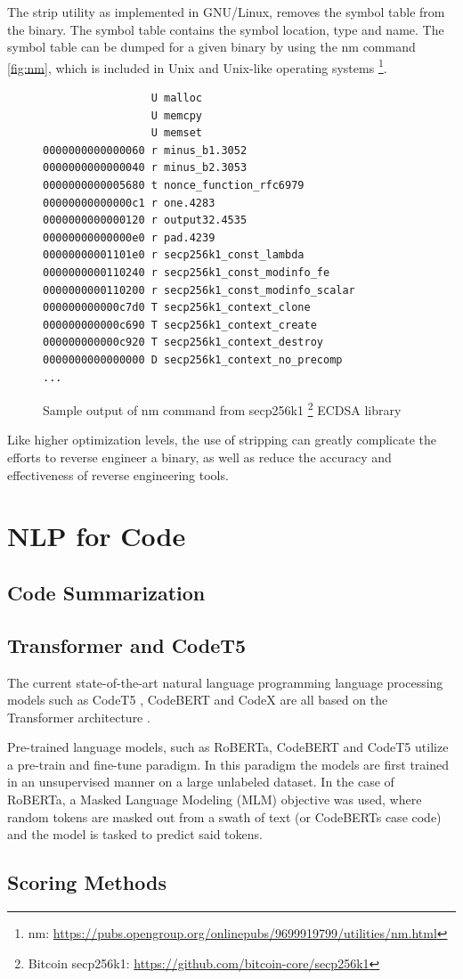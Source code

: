 The strip utility as implemented in GNU/Linux, removes the symbol table from the binary. The symbol table contains the symbol location, type and name. The symbol table can be dumped for a given binary by using the nm command \ref{fig:nm}, which is included in Unix and Unix-like operating systems \footnote{nm: \url{https://pubs.opengroup.org/onlinepubs/9699919799/utilities/nm.html}}. 

\label{fig:nm}
\begin{figure}[!h]
  \centering
\begin{lstlisting}
                 U malloc
                 U memcpy
                 U memset
0000000000000060 r minus_b1.3052
0000000000000040 r minus_b2.3053
0000000000005680 t nonce_function_rfc6979
00000000000000c1 r one.4283
0000000000000120 r output32.4535
00000000000000e0 r pad.4239
00000000001101e0 r secp256k1_const_lambda
0000000000110240 r secp256k1_const_modinfo_fe
0000000000110200 r secp256k1_const_modinfo_scalar
000000000000c7d0 T secp256k1_context_clone
000000000000c690 T secp256k1_context_create
000000000000c920 T secp256k1_context_destroy
0000000000000000 D secp256k1_context_no_precomp
...
\end{lstlisting}
  \caption{Sample output of nm command from secp256k1 \protect\footnote{Bitcoin secp256k1: \protect\url{https://github.com/bitcoin-core/secp256k1}} ECDSA library}
\end{figure}

Like higher optimization levels, the use of stripping can greatly complicate the efforts to reverse engineer a binary, as well as reduce the accuracy and effectiveness of reverse engineering tools. 
\section{NLP for Code}

\subsection{Code Summarization}

\subsection{Transformer and CodeT5}
The current state-of-the-art natural language programming language processing models such as CodeT5 \cite{CodeT5}, CodeBERT \cite{CodeBERT} and CodeX \cite{CodeX} are all based on the Transformer architecture \cite{Transformers}.

Pre-trained language models, such as RoBERTa, CodeBERT \cite{CodeBERT} and CodeT5 \cite{CodeT5} utilize a pre-train and fine-tune paradigm. In this paradigm the models are first trained in an unsupervised manner on a large unlabeled dataset. In the case of RoBERTa, a Masked Language Modeling (MLM) objective was used, where random tokens are masked out from a swath of text (or CodeBERTs case code) and the model is tasked to predict said tokens.

\subsection{Scoring Methods}